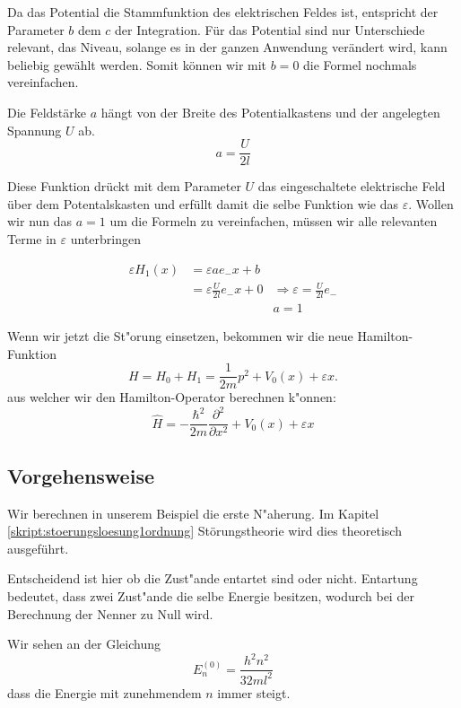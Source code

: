 \begin{refsection}
Da das Potential die Stammfunktion des elektrischen Feldes ist, entspricht der Parameter $b$ dem $c$ der Integration.
F\"ur das Potential sind nur Unterschiede relevant, das Niveau, solange es in der ganzen Anwendung ver\"andert wird,
kann beliebig gew\"ahlt werden. Somit k\"onnen wir mit $b=0$ die Formel nochmals vereinfachen.

Die Feldst\"arke $a$ h\"angt von der Breite des Potentialkastens und der angelegten Spannung $U$ ab.
\[
  a = \frac{ U }{2 l}
\]

Diese Funktion dr\"uckt mit dem Parameter $U$ das eingeschaltete elektrische Feld \"uber dem Potentalskasten
und erf\"ullt damit die selbe Funktion wie das $\varepsilon$.
Wollen wir nun das $a = 1$ um die Formeln zu vereinfachen, m\"ussen wir alle relevanten Terme in $\varepsilon$ unterbringen

\begin{equation}
\begin{aligned}
  \varepsilon H_1(x) &= \varepsilon a e_{-} x +b  & \\
                     &= \varepsilon \frac{ U }{2 l} e_{-} x + 0  &\Longrightarrow \varepsilon = \frac{ U }{2 l} e_{-} \\
                     &                                           & a = 1
\end{aligned}
\end{equation} %



Wenn wir jetzt die St"orung einsetzen, bekommen wir die neue Hamilton-Funktion
\[
  H = H_0 + H_1 
    = \frac1{2m}p^2+V_0(x) + \varepsilon x.
\]
aus welcher wir den Hamilton-Operator berechnen k"onnen:
\[
  \hat{H} = -\frac{\hbar^2}{2m} \frac{\partial^2}{\partial x^2} + V_0(x) + \varepsilon x
\]

\subsection{Vorgehensweise}
Wir berechnen in unserem Beispiel die erste N"aherung.
Im Kapitel \ref{skript:stoerungsloesung1ordnung} St\"orungstheorie wird dies 
theoretisch ausgef\"uhrt.

Entscheidend ist hier ob die Zust"ande entartet sind oder nicht.
Entartung bedeutet, dass zwei Zust"ande die selbe Energie besitzen, 
wodurch bei der Berechnung der Nenner zu Null wird.

Wir sehen an der Gleichung
\[
  E_n^{(0)} = \frac{h^2n^2}{32ml^2}
\]
dass die Energie mit zunehmendem $n$ immer steigt. 


\end{refsection}
